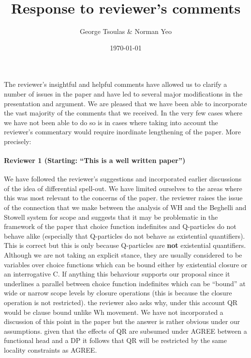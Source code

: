 \documentclass[11pt]{article}
\begin{document}
\title{Response to reviewer's comments}
\author{George Tsoulas \& Norman Yeo}
\date{\today}

\maketitle


The reviewer's insightful and helpful comments have allowed us to clarify a number of issues in the paper and have led to several major modifications in the presentation and argument.  We are pleased that we have been able to incorporate the vast majority of the comments that we received.  In the very few cases where we have not been able to do so is in cases where taking into account the reviewer's commentary would require inordinate lengthening of the paper.  More precisely:

\paragraph{Reviewer 1 (Starting: ``This is a well written paper'')}  We have followed the reviewer's suggestions and incorporated earlier discussions of the idea of differential spell-out.  We have limited ourselves to the areas where this was most relevant to the concerns of the paper.  the reviewer raises the issue of the connection that we make between the analysis of WH and the Beghelli and Stowell system for scope and suggests that it may be problematic in the framework of the paper that choice function  indefinites and Q-particles do not behave alike (especially that Q-particles do not behave as existential quantifiers).  This is correct but this is only because Q-particles are \textbf{not} existential quantifiers.  Although we are not taking an explicit stance, they are usually considered to be variables over choice functions which can be bound either by existential closure or an interrogative C.  If anything this behaviour supports our proposal since it underlines a parallel between choice function indefinites which can be ``bound'' at wide or narrow scope levels by closure operations (this is because the closure operation is not restricted).
the reviewer also asks why, under this account QR would be clause bound unlike Wh movement.  We have not incorporated a discussion of this point in the paper but the answer is rather obvious under our assumptions.  given that the effects of QR are subsumed under AGREE between a functional head and a DP it follows that QR will be restricted by the same locality constraints as AGREE.
\end{document}
